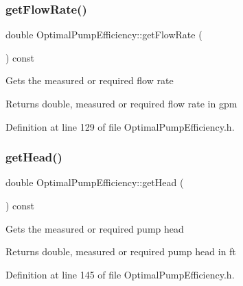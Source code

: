 \mbox{\label{class_optimal_pump_efficiency_a77c6618681b0fd3a0fc02dc49d16ee99}} 
\subsubsection{\texorpdfstring{get\+Flow\+Rate()}{getFlowRate()}}
{\footnotesize\ttfamily double Optimal\+Pump\+Efficiency\+::get\+Flow\+Rate (\begin{DoxyParamCaption}{ }\end{DoxyParamCaption}) const\hspace{0.3cm}{\ttfamily [inline]}}

Gets the measured or required flow rate \begin{DoxyReturn}{Returns}
double, measured or required flow rate in gpm 
\end{DoxyReturn}


Definition at line 129 of file Optimal\+Pump\+Efficiency.\+h.

\mbox{\label{class_optimal_pump_efficiency_af31fdb10aabc197ff7536c9bbe006573}} 
\subsubsection{\texorpdfstring{get\+Head()}{getHead()}}
{\footnotesize\ttfamily double Optimal\+Pump\+Efficiency\+::get\+Head (\begin{DoxyParamCaption}{ }\end{DoxyParamCaption}) const\hspace{0.3cm}{\ttfamily [inline]}}

Gets the measured or required pump head \begin{DoxyReturn}{Returns}
double, measured or required pump head in ft 
\end{DoxyReturn}


Definition at line 145 of file Optimal\+Pump\+Efficiency.\+h.

\mbox{\label{class_optimal_pump_efficiency_a8c2f7fcacce2b42ed83f29aec2d4671e}} 
